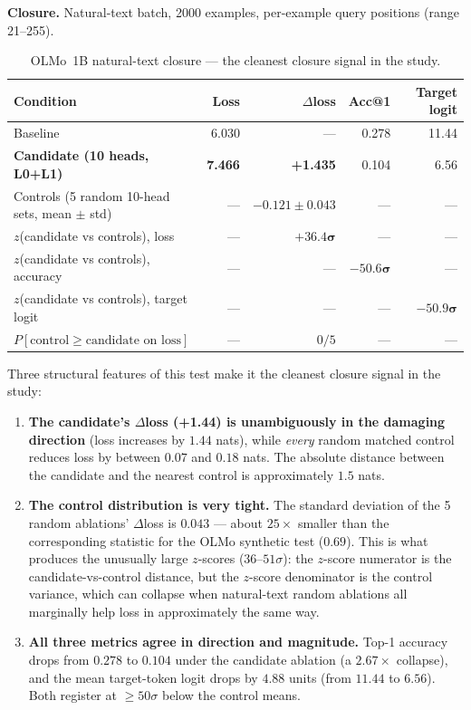 \documentclass[11pt]{article}
\begin{document}
\textbf{Closure.} Natural-text batch, 2000 examples, per-example query
positions (range 21--255).

\begin{table}[h]
\centering
\small
\begin{tabularx}{\textwidth}{lrrrr}
\toprule
Condition & Loss & $\Delta$loss & Acc@1 & Target logit \\
\midrule
Baseline & 6.030 & --- & 0.278 & 11.44 \\
\textbf{Candidate (10 heads, L0+L1)} & \textbf{7.466} & \textbf{+1.435} & 0.104 & 6.56 \\
Controls (5 random 10-head sets, mean $\pm$ std) & --- & $-0.121 \pm 0.043$ & --- & --- \\
$z$(candidate vs controls), loss & --- & $\mathbf{+36.4\sigma}$ & --- & --- \\
$z$(candidate vs controls), accuracy & --- & --- & $\mathbf{-50.6\sigma}$ & --- \\
$z$(candidate vs controls), target logit & --- & --- & --- & $\mathbf{-50.9\sigma}$ \\
$P[\text{control} \geq \text{candidate on loss}]$ & --- & $0/5$ & --- & --- \\
\bottomrule
\end{tabularx}
\caption{OLMo~1B natural-text closure --- the cleanest closure signal in
the study.}
\label{tab:olmo-natural}
\end{table}

Three structural features of this test make it the cleanest closure signal
in the study:

\begin{enumerate}
\item \textbf{The candidate's $\Delta$loss (+1.44) is unambiguously in the
  damaging direction} (loss increases by $1.44$ nats), while \emph{every}
  random matched control reduces loss by between $0.07$ and $0.18$ nats.
  The absolute distance between the candidate and the nearest control is
  approximately $1.5$ nats.

\item \textbf{The control distribution is very tight.} The standard
  deviation of the 5 random ablations' $\Delta$loss is $0.043$ --- about
  $25\times$ smaller than the corresponding statistic for the OLMo
  synthetic test ($0.69$). This is what produces the unusually large
  $z$-scores ($36$--$51\sigma$): the $z$-score numerator is the
  candidate-vs-control distance, but the $z$-score denominator is the
  control variance, which can collapse when natural-text random ablations
  all marginally help loss in approximately the same way.

\item \textbf{All three metrics agree in direction and magnitude.} Top-1
  accuracy drops from $0.278$ to $0.104$ under the candidate ablation (a
  $2.67\times$ collapse), and the mean target-token logit drops by $4.88$
  units (from $11.44$ to $6.56$). Both register at $\geq 50\sigma$ below
  the control means.
\end{enumerate}
\end{document}

